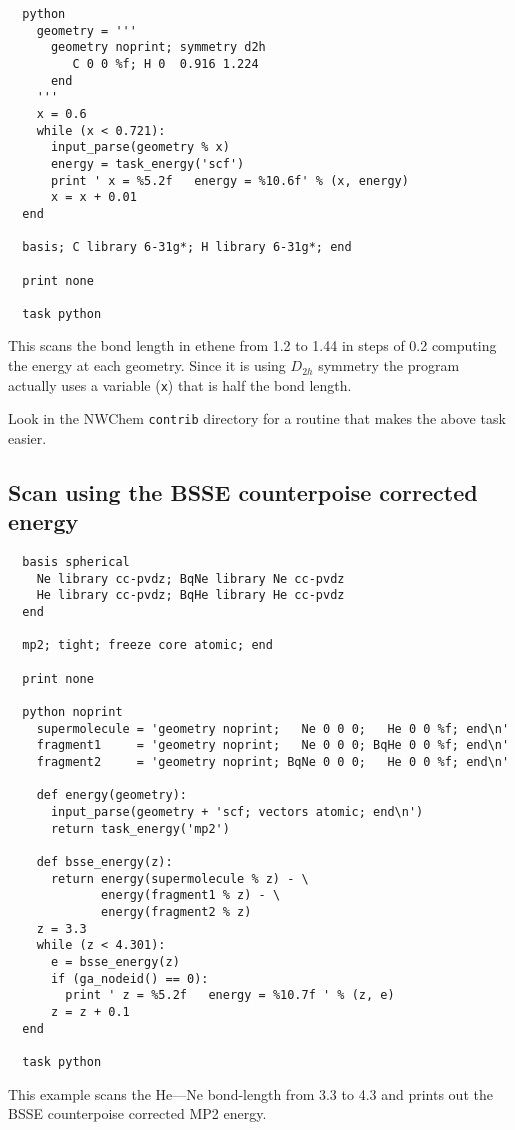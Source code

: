 \begin{verbatim}
  python
    geometry = '''
      geometry noprint; symmetry d2h
         C 0 0 %f; H 0  0.916 1.224
      end
    '''
    x = 0.6
    while (x < 0.721):
      input_parse(geometry % x)
      energy = task_energy('scf')
      print ' x = %5.2f   energy = %10.6f' % (x, energy)
      x = x + 0.01
  end

  basis; C library 6-31g*; H library 6-31g*; end

  print none

  task python
\end{verbatim}

This scans the bond length in ethene from 1.2 to 1.44 in steps 
of 0.2 computing the energy at each geometry.  Since it is using 
$D_{2h}$ symmetry the program actually uses a variable (\verb+x+) that is
half the bond length.

Look in the NWChem \verb+contrib+ directory for a routine that makes
the above task easier.

\subsection{Scan using the BSSE counterpoise corrected energy}

\begin{verbatim}
  basis spherical
    Ne library cc-pvdz; BqNe library Ne cc-pvdz
    He library cc-pvdz; BqHe library He cc-pvdz
  end

  mp2; tight; freeze core atomic; end

  print none

  python noprint
    supermolecule = 'geometry noprint;   Ne 0 0 0;   He 0 0 %f; end\n'
    fragment1     = 'geometry noprint;   Ne 0 0 0; BqHe 0 0 %f; end\n'
    fragment2     = 'geometry noprint; BqNe 0 0 0;   He 0 0 %f; end\n'

    def energy(geometry):
      input_parse(geometry + 'scf; vectors atomic; end\n')
      return task_energy('mp2')

    def bsse_energy(z):
      return energy(supermolecule % z) - \
             energy(fragment1 % z) - \
             energy(fragment2 % z)
    z = 3.3
    while (z < 4.301):
      e = bsse_energy(z)
      if (ga_nodeid() == 0):
        print ' z = %5.2f   energy = %10.7f ' % (z, e)
      z = z + 0.1
  end

  task python
\end{verbatim}

This example scans the He---Ne bond-length from 3.3 to 4.3 and prints out
the BSSE counterpoise corrected MP2 energy.

